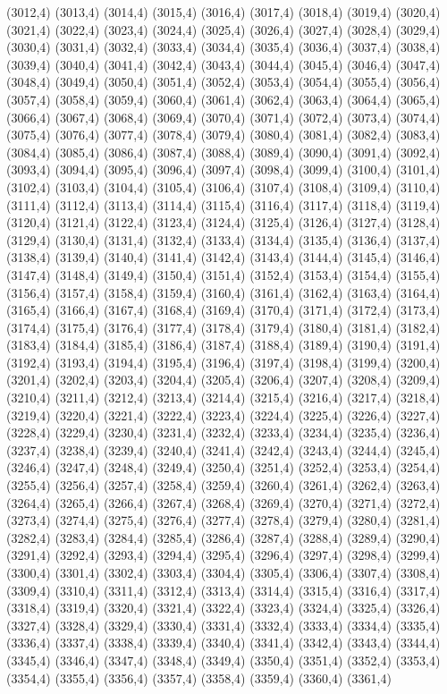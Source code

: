 (3012,4)
(3013,4)
(3014,4)
(3015,4)
(3016,4)
(3017,4)
(3018,4)
(3019,4)
(3020,4)
(3021,4)
(3022,4)
(3023,4)
(3024,4)
(3025,4)
(3026,4)
(3027,4)
(3028,4)
(3029,4)
(3030,4)
(3031,4)
(3032,4)
(3033,4)
(3034,4)
(3035,4)
(3036,4)
(3037,4)
(3038,4)
(3039,4)
(3040,4)
(3041,4)
(3042,4)
(3043,4)
(3044,4)
(3045,4)
(3046,4)
(3047,4)
(3048,4)
(3049,4)
(3050,4)
(3051,4)
(3052,4)
(3053,4)
(3054,4)
(3055,4)
(3056,4)
(3057,4)
(3058,4)
(3059,4)
(3060,4)
(3061,4)
(3062,4)
(3063,4)
(3064,4)
(3065,4)
(3066,4)
(3067,4)
(3068,4)
(3069,4)
(3070,4)
(3071,4)
(3072,4)
(3073,4)
(3074,4)
(3075,4)
(3076,4)
(3077,4)
(3078,4)
(3079,4)
(3080,4)
(3081,4)
(3082,4)
(3083,4)
(3084,4)
(3085,4)
(3086,4)
(3087,4)
(3088,4)
(3089,4)
(3090,4)
(3091,4)
(3092,4)
(3093,4)
(3094,4)
(3095,4)
(3096,4)
(3097,4)
(3098,4)
(3099,4)
(3100,4)
(3101,4)
(3102,4)
(3103,4)
(3104,4)
(3105,4)
(3106,4)
(3107,4)
(3108,4)
(3109,4)
(3110,4)
(3111,4)
(3112,4)
(3113,4)
(3114,4)
(3115,4)
(3116,4)
(3117,4)
(3118,4)
(3119,4)
(3120,4)
(3121,4)
(3122,4)
(3123,4)
(3124,4)
(3125,4)
(3126,4)
(3127,4)
(3128,4)
(3129,4)
(3130,4)
(3131,4)
(3132,4)
(3133,4)
(3134,4)
(3135,4)
(3136,4)
(3137,4)
(3138,4)
(3139,4)
(3140,4)
(3141,4)
(3142,4)
(3143,4)
(3144,4)
(3145,4)
(3146,4)
(3147,4)
(3148,4)
(3149,4)
(3150,4)
(3151,4)
(3152,4)
(3153,4)
(3154,4)
(3155,4)
(3156,4)
(3157,4)
(3158,4)
(3159,4)
(3160,4)
(3161,4)
(3162,4)
(3163,4)
(3164,4)
(3165,4)
(3166,4)
(3167,4)
(3168,4)
(3169,4)
(3170,4)
(3171,4)
(3172,4)
(3173,4)
(3174,4)
(3175,4)
(3176,4)
(3177,4)
(3178,4)
(3179,4)
(3180,4)
(3181,4)
(3182,4)
(3183,4)
(3184,4)
(3185,4)
(3186,4)
(3187,4)
(3188,4)
(3189,4)
(3190,4)
(3191,4)
(3192,4)
(3193,4)
(3194,4)
(3195,4)
(3196,4)
(3197,4)
(3198,4)
(3199,4)
(3200,4)
(3201,4)
(3202,4)
(3203,4)
(3204,4)
(3205,4)
(3206,4)
(3207,4)
(3208,4)
(3209,4)
(3210,4)
(3211,4)
(3212,4)
(3213,4)
(3214,4)
(3215,4)
(3216,4)
(3217,4)
(3218,4)
(3219,4)
(3220,4)
(3221,4)
(3222,4)
(3223,4)
(3224,4)
(3225,4)
(3226,4)
(3227,4)
(3228,4)
(3229,4)
(3230,4)
(3231,4)
(3232,4)
(3233,4)
(3234,4)
(3235,4)
(3236,4)
(3237,4)
(3238,4)
(3239,4)
(3240,4)
(3241,4)
(3242,4)
(3243,4)
(3244,4)
(3245,4)
(3246,4)
(3247,4)
(3248,4)
(3249,4)
(3250,4)
(3251,4)
(3252,4)
(3253,4)
(3254,4)
(3255,4)
(3256,4)
(3257,4)
(3258,4)
(3259,4)
(3260,4)
(3261,4)
(3262,4)
(3263,4)
(3264,4)
(3265,4)
(3266,4)
(3267,4)
(3268,4)
(3269,4)
(3270,4)
(3271,4)
(3272,4)
(3273,4)
(3274,4)
(3275,4)
(3276,4)
(3277,4)
(3278,4)
(3279,4)
(3280,4)
(3281,4)
(3282,4)
(3283,4)
(3284,4)
(3285,4)
(3286,4)
(3287,4)
(3288,4)
(3289,4)
(3290,4)
(3291,4)
(3292,4)
(3293,4)
(3294,4)
(3295,4)
(3296,4)
(3297,4)
(3298,4)
(3299,4)
(3300,4)
(3301,4)
(3302,4)
(3303,4)
(3304,4)
(3305,4)
(3306,4)
(3307,4)
(3308,4)
(3309,4)
(3310,4)
(3311,4)
(3312,4)
(3313,4)
(3314,4)
(3315,4)
(3316,4)
(3317,4)
(3318,4)
(3319,4)
(3320,4)
(3321,4)
(3322,4)
(3323,4)
(3324,4)
(3325,4)
(3326,4)
(3327,4)
(3328,4)
(3329,4)
(3330,4)
(3331,4)
(3332,4)
(3333,4)
(3334,4)
(3335,4)
(3336,4)
(3337,4)
(3338,4)
(3339,4)
(3340,4)
(3341,4)
(3342,4)
(3343,4)
(3344,4)
(3345,4)
(3346,4)
(3347,4)
(3348,4)
(3349,4)
(3350,4)
(3351,4)
(3352,4)
(3353,4)
(3354,4)
(3355,4)
(3356,4)
(3357,4)
(3358,4)
(3359,4)
(3360,4)
(3361,4)